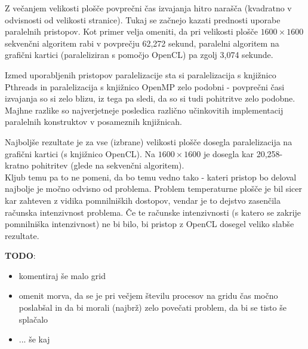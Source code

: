 \documentclass[a4paper,titlepage,11pt]{article}
\begin{document}
Z večanjem velikosti plošče povprečni čas izvajanja hitro narašča (kvadratno v odvisnosti od velikosti stranice). Tukaj se začnejo kazati prednosti uporabe paralelnih pristopov. Kot primer velja omeniti, da pri velikosti plošče $1600 \times 1600$ sekvenčni algoritem rabi v povprečju 62,272 sekund, paralelni algoritem na grafični kartici (paraleliziran s pomočjo OpenCL) pa zgolj 3,074 sekunde.

Izmed uporabljenih pristopov paralelizacije sta si paralelizacija s knjižnico Pthreads in paralelizacija s knjižnico OpenMP zelo podobni - povprečni časi izvajanja so si zelo blizu, iz tega pa sledi, da so si tudi pohitritve zelo podobne. Majhne razlike so najverjetneje posledica različno učinkovitih implementacij paralelnih konstruktov v posameznih knjižnicah.

Najboljše rezultate je za vse (izbrane) velikosti plošče dosegla paralelizacija na grafični kartici (s knjižnico OpenCL). Na $1600 \times 1600$ je dosegla kar 20,258-kratno pohitritev (glede na sekvenčni algoritem). \\
Kljub temu pa to ne pomeni, da bo temu vedno tako - kateri pristop bo deloval najbolje je močno odvisno od problema. Problem temperaturne plošče je bil sicer kar zahteven z vidika pomnilniških dostopov, vendar je to dejstvo zasenčila računska intenzivnost problema. Če te računske intenzivnosti (s katero se zakrije pomnilniška intenzivnost) ne bi bilo, bi pristop z OpenCL dosegel veliko slabše rezultate.



\textbf{TODO}: 
\begin{itemize}
\item komentiraj še malo grid
\item omenit morva, da se je pri večjem številu procesov na gridu čas močno poslabšal in da bi morali (najbrž) zelo povečati problem, da bi se tisto še splačalo
\item ... še kaj
\end{itemize}
\end{document}
